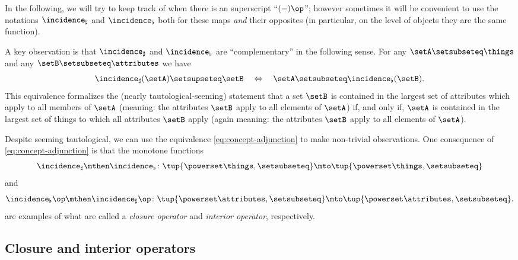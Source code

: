 In the following, we will try to keep track of when there is an superscript ``$( - )\op $''; however sometimes it will be convenient to use the notations $\incidence_\sharp$ and $\incidence_\flat$ both for these maps \emph{and} their opposites (in particular, on the level of objects they are the same function).

A key observation is that $\incidence_\sharp$ and $\incidence_\flat$ are ``complementary'' in the following sense.
For any $\setA \setsubseteq \things$ and any $\setB \setsubseteq \attributes$ we have
\begin{equation}\label{eq:concept-adjunction}
    \incidence_\sharp(\setA) \setsupseteq \setB \quad \Leftrightarrow \quad \setA \setsubseteq \incidence_\flat(\setB).
\end{equation}
This equivalence formalizes the (nearly tautological-seeming) statement that a set $\setB$ is contained in the largest set of attributes which apply to all members of $\setA$ (meaning: the attributes $\setB$ apply to all elements of $\setA$) if, and only if, $\setA$ is contained in the largest set of things to which all attributes $\setB$ apply (again meaning: the attributes $\setB$ apply to all elements of $\setA$).

Despite seeming tautological, we can use the equivalence \cref{eq:concept-adjunction} to make non-trivial observations.
One consequence of \cref{eq:concept-adjunction} is that the monotone functions
\begin{equation}\label{eq:fca-closure-operator-things}
    \incidence_\sharp \mthen \incidence_\flat \colon \tup{\powerset \things, \setsubseteq} \mto \tup{\powerset \things, \setsubseteq}
\end{equation}
and
\begin{equation}\label{eq:fca-closure-operator-attributes}
    \incidence_\flat\op \mthen \incidence_\sharp\op \colon \tup{\powerset \attributes, \setsubseteq} \mto \tup{\powerset \attributes, \setsubseteq}.
\end{equation}
are examples of what are called a \emph{closure operator} and \emph{interior operator}, respectively.

\subsection{Closure and interior operators}

